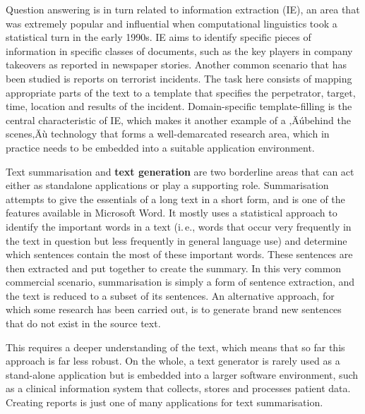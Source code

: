 \begin{multicols}{2}

Question answering is in turn related to information extraction (IE), an area that was extremely popular and influential when computational linguistics took a statistical turn in the early 1990s. IE aims to identify specific pieces of information in specific classes of documents, such as the key players in company takeovers as reported in newspaper stories. Another common scenario that has been studied is reports on terrorist incidents. The task here consists of mapping appropriate parts of the text to a template that specifies the perpetrator, target, time, location and results of the incident. Domain-specific template-filling is the central characteristic of IE, which makes it another example of a ‚Äúbehind the scenes‚Äù technology that forms a well-demarcated research area, which in practice needs to be embedded into a suitable application environment.

Text summarisation and \textbf{text generation} are two borderline areas
that can act either as standalone applications or play a supporting
role. Summarisation attempts to give the essentials of a long text in a short
form, and is one of the features available in Microsoft Word. It mostly uses a
statistical approach to identify the important words in a text (i.\,e.,
words that occur very frequently in the text in question but less frequently
in general language use) and determine which sentences contain the most of
these important words. These sentences are then extracted and put
together to create the summary.  In this very common commercial scenario, summarisation is simply a form of sentence extraction, and the text is reduced to a subset of its sentences. An alternative approach, for which some research has been carried out, is to generate brand new sentences that do not exist in the source text. 

 

This requires a deeper understanding of the text, which means that so
far this approach is far less robust. On the whole, a text generator
is rarely used as a stand-alone application but is embedded into a
larger software environment, such as a clinical information system
that collects, stores and processes patient data. Creating reports is
just one of many applications for text summarisation. 


\end{multicols}
